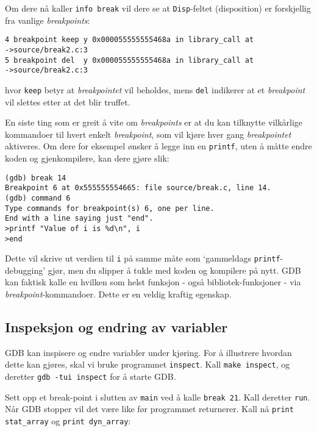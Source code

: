 Om dere nå kaller \verb|info break| vil dere se at \verb|Disp|-feltet (disposition) er forskjellig fra vanlige \textit{breakpoints}:

\begin{lstlisting}[mathescape=true,keywordstyle=\color{black}]
4 breakpoint keep y 0x000055555555468a in library_call at
->source/break2.c:3
5 breakpoint del  y 0x000055555555468a in library_call at
->source/break2.c:3
\end{lstlisting}


hvor \verb|keep| betyr at \textit{breakpointet} vil beholdes, mens \verb|del| indikerer at et \textit{breakpoint} vil slettes etter at det blir truffet.

En siste ting som er greit å vite om \textit{breakpoints} er at du kan tilknytte vilkårlige kommandoer til hvert enkelt \textit{breakpoint}, som vil kjøre hver gang \textit{breakpointet} aktiveres. Om dere for eksempel ønsker å legge inn en \verb|printf|, uten å måtte endre koden og gjenkompilere, kan dere gjøre slik:

\begin{lstlisting}[mathescape=true,keywordstyle=\color{black}]
(gdb) break 14
Breakpoint 6 at 0x555555554665: file source/break.c, line 14.
(gdb) command 6
Type commands for breakpoint(s) 6, one per line.
End with a line saying just "end".
>printf "Value of i is %d\n", i
>end
\end{lstlisting}

Dette vil skrive ut verdien til \verb|i| på samme måte som `gammeldags \verb|printf|-debugging' gjør, men du slipper å tukle med koden og kompilere på nytt. GDB kan faktisk kalle en hvilken som helst funksjon - også bibliotek-funksjoner - via \textit{breakpoint}-kommandoer. Dette er en veldig kraftig egenskap.

\subsection{Inspeksjon og endring av variabler}

GDB kan inspisere og endre variabler under kjøring. For å illustrere hvordan dette kan gjøres, skal vi bruke programmet \verb|inspect|. Kall \verb|make inspect|, og deretter \verb|gdb -tui inspect| for å starte GDB.

Sett opp et break-point i slutten av \verb|main| ved å kalle \verb|break 21|. Kall deretter \verb|run|. Når GDB stopper vil det være like før programmet returnerer. Kall nå \verb|print stat_array| og \verb|print dyn_array|:

